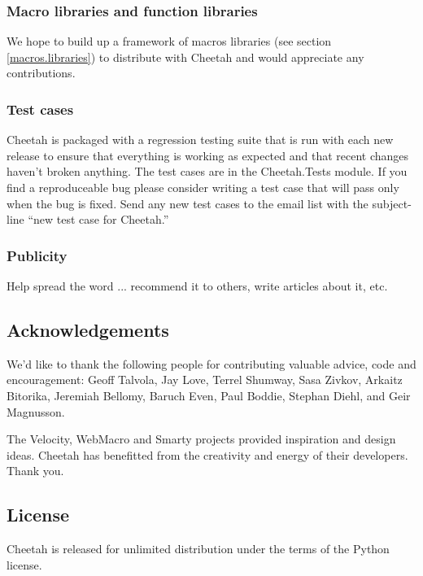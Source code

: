 \subsubsection{Macro libraries and function libraries}
We hope to build up a framework of macros libraries (see section
\ref{macros.libraries}) to distribute with Cheetah and would appreciate
any contributions.

\subsubsection{Test cases}
Cheetah is packaged with a regression testing suite that is run with each
new release to ensure that everything is working as expected and that recent
changes haven't broken anything.  The test cases are in the Cheetah.Tests
module.  If you find a reproduceable bug please consider writing a test case
that will pass only when the bug is fixed.  Send any new test cases to the email
list with the subject-line ``new test case for Cheetah.''

\subsubsection{Publicity}
Help spread the word ... recommend it to others, write articles about it, etc.

\subsection{Acknowledgements}
\label{intro.acknowledgments}
    
We'd like to thank the following people for contributing valuable advice, code
and encouragement: Geoff Talvola, Jay Love, Terrel Shumway, Sasa Zivkov, Arkaitz
Bitorika, Jeremiah Bellomy, Baruch Even, Paul Boddie, Stephan Diehl, and Geir
Magnusson.
    
The Velocity, WebMacro and Smarty projects provided inspiration and design
ideas.  Cheetah has benefitted from the creativity and energy of their
developers. Thank you.

\subsection{License}
\label{intro.license}

Cheetah is released for unlimited distribution under the terms of the
Python license.

